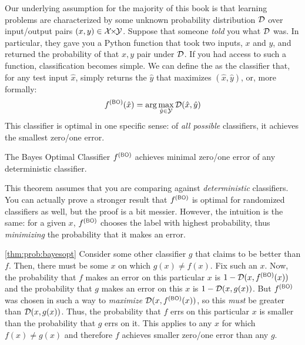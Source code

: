 Our underlying assumption for the majority of this book is that
learning problems are characterized by some unknown probability
distribution $\mathcal{D}$ over input/output pairs $(x,y) \in \cX \times \cY$.
Suppose that someone \emph{told} you what $\mathcal{D}$ was.  In particular,
they gave you a Python function  that took two inputs,
$x$ and $y$, and returned the probability of that $x,y$ pair under
$\mathcal{D}$.  If you had access to such a function, classification becomes
simple.  We can define the  as the
classifier that, for any test input $\hat x$, simply returns the $\hat
y$ that maximizes $(\hat x, \hat y)$, or, more formally:
%
\begin{equation} \label{eq:prob:bayesopt}
  f\xth{BO}(\hat x) = \arg\max_{\hat y \in \cY} \cD(\hat x, \hat y)
\end{equation}
%
This classifier is optimal in one specific sense: of \emph{all
  possible} classifiers, it achieves the smallest zero/one error.

\begin{theorem} \label{thm:prob:bayesopt}
  The Bayes Optimal Classifier $f\xth{BO}$ achieves minimal zero/one
  error of any deterministic classifier.
\end{theorem}

This theorem assumes that you are comparing against
\emph{deterministic} classifiers.  You can actually prove a stronger
result that $f\xth{BO}$ is optimal for randomized classifiers as well,
but the proof is a bit messier.  However, the intuition is the same:
for a given $x$, $f\xth{BO}$ chooses the label with highest
probability, thus \emph{minimizing} the probability that it makes an
error.

\begin{myproof}{\ref{thm:prob:bayesopt}}
  Consider some other classifier $g$ that claims to be better than
  $f$.  Then, there must be some $x$ on which $g(x) \neq f(x)$.  Fix
  such an $x$.  Now, the probability that $f$ makes an error on this
  particular $x$ is $1 - \cD(x, f\xth{BO}(x))$ and the probability
  that $g$ makes an error on this $x$ is $1 - \mathcal{D}(x, g(x))$.  But
  $f\xth{BO}$ was chosen in such a way to \emph{maximize} $\cD(x,
  f\xth{BO}(x))$, so this \emph{must} be greater than $\mathcal{D}(x, g(x))$.
  Thus, the probability that $f$ errs on this particular $x$ is
  smaller than the probability that $g$ errs on it.  This applies to
  any $x$ for which $f(x) \neq g(x)$ and therefore $f$ achieves
  smaller zero/one error than any $g$.
\end{myproof}


